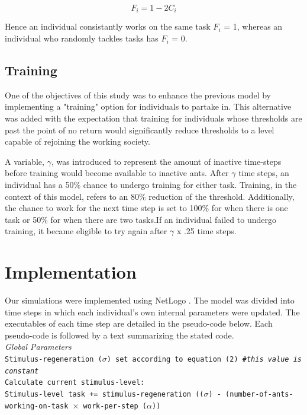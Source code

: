 \documentclass[a4paper]{article}
\begin{document}
\begin{equation}
F_i = 1 - 2C_i
\end{equation}

Hence an individual consistantly works on the same task $F_i$ = 1, whereas an individual who randomly tackles tasks has $F_i$ = 0.

\subsection{Training}


One of the objectives of this study was to enhance the previous model by implementing a "training" option for individuals to partake in. This alternative was added with the expectation that training for individuals whose thresholds are past the point of no return would significantly reduce thresholds to a level capable of rejoining the working society. 

A variable, $\gamma$, was introduced to represent the amount of inactive time-steps before training would become available to inactive ants. After $\gamma$ time steps, an individual has a 50\% chance to undergo training for either task. Training, in the context of this model, refers to an 80\% reduction of the threshold. Additionally, the chance to work for the next time step is set to 100\% for when there is one task or 50\% for when there are two tasks.If an individual failed to undergo training, it became eligible to try again after $\gamma$ x .25 time steps. 




\section{Implementation}

Our simulations were implemented using NetLogo \cite{Netlogo}. The model was divided into time steps in which each individual’s own internal parameters were updated. The executables of each time step are detailed in the pseudo-code below. Each pseudo-code is followed by a text summarizing the stated code.\\ 


\noindent \textit{Global Parameters}\\
\texttt{Stimulus-regeneration ($\sigma$) set according to equation (2) \textit{\#this value is constant}\\
\noindent Calculate current stimulus-level:\\
\indent Stimulus-level task += stimulus-regeneration (($\sigma$) - (number-of-ants-working-on-task $\times$ work-per-step ($\alpha$))}\\
\end{document}
